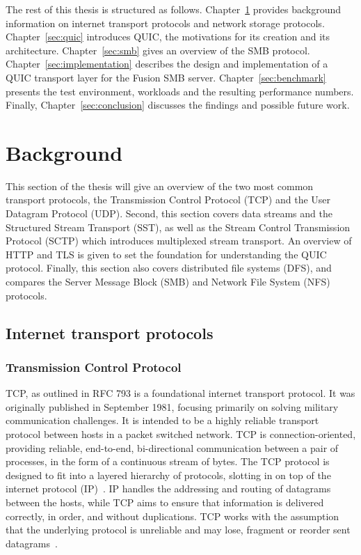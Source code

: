 \documentclass[english, 12pt, a4paper, elec, utf8, a-2b, online]{aaltothesis}
\begin{document}
The rest of this thesis is structured as follows. Chapter~\ref{sec:background} provides
background information on internet transport protocols and network storage protocols. Chapter~\ref{sec:quic} introduces
QUIC, the motivations for its creation and its architecture. Chapter~\ref{sec:smb} gives
an overview of the SMB protocol. Chapter~\ref{sec:implementation} describes the design
and implementation of a QUIC transport layer for the Fusion SMB server. Chapter~\ref{sec:benchmark}
presents the test environment, workloads and the resulting performance numbers. Finally, Chapter~\ref{sec:conclusion}
discusses the findings and possible future work.
\clearpage

\section{Background}
\label{sec:background}
This section of the thesis will give an overview of the two most common transport
protocols, the Transmission Control Protocol (TCP) and the User Datagram Protocol (UDP).
Second, this section covers data streams and the Structured Stream Transport (SST),
as well as the Stream Control Transmission Protocol (SCTP) which introduces multiplexed
stream transport. An overview of HTTP and TLS is given to set the foundation for
understanding the QUIC protocol. Finally, this section also covers distributed
file systems (DFS), and compares the Server Message Block (SMB) and Network File System (NFS) protocols.
\subsection{Internet transport protocols}
\subsubsection{Transmission Control Protocol}
TCP, as outlined in RFC 793\cite{rfc793} is a foundational internet transport protocol. It was
originally published in September 1981, focusing primarily on solving military
communication challenges. It is intended to be a highly reliable transport
protocol between hosts in a packet switched network. TCP is connection-oriented,
providing reliable, end-to-end, bi-directional communication between a pair of processes, in the
form of a continuous stream of bytes. The TCP protocol is designed to fit into
a layered hierarchy of protocols, slotting
in on top of the internet protocol (IP)~\cite{rfc791}. IP handles the addressing
and routing of datagrams between the hosts, while TCP aims to ensure that
information is delivered correctly, in order, and without duplications. TCP works with
the assumption that the underlying protocol is unreliable and may lose,
fragment or reorder sent datagrams~\cite{rfc793}.
\end{document}
